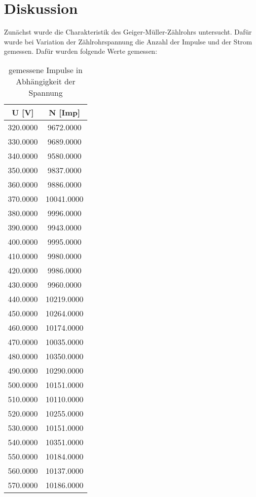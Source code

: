 \section{Diskussion}
\label{sec:Diskussion}

Zunächst wurde die Charakteristik des Geiger-Müller-Zählrohrs untersucht. Dafür wurde bei Variation
der Zählrohrspannung die Anzahl der Impulse und der Strom gemessen. Dafür wurden folgende Werte 
gemessen:
\begin{table}[H]
    \centering
    \caption{gemessene Impulse in Abhängigkeit der Spannung}
    \label{tab:data}
    \begin{tabular}{c c}
    \toprule
    U [V] & N [Imp] \\
    \midrule
    320.0000 &  9672.0000 \\   
    330.0000 &  9689.0000 \\
    340.0000 &  9580.0000 \\   
    350.0000 &  9837.0000 \\   
    360.0000 &  9886.0000 \\   
    370.0000 & 10041.0000 \\   
    380.0000 &  9996.0000 \\   
    390.0000 &  9943.0000 \\   
    400.0000 &  9995.0000 \\   
    410.0000 &  9980.0000 \\   
    420.0000 &  9986.0000 \\   
    430.0000 &  9960.0000 \\   
    440.0000 & 10219.0000 \\   
    450.0000 & 10264.0000 \\   
    460.0000 & 10174.0000 \\   
    470.0000 & 10035.0000 \\   
    480.0000 & 10350.0000 \\   
    490.0000 & 10290.0000 \\   
    500.0000 & 10151.0000 \\   
    510.0000 & 10110.0000 \\   
    520.0000 & 10255.0000 \\   
    530.0000 & 10151.0000 \\   
    540.0000 & 10351.0000 \\   
    550.0000 & 10184.0000 \\   
    560.0000 & 10137.0000 \\   
    570.0000 & 10186.0000 \\   

\end{tabular}
\end{table}
